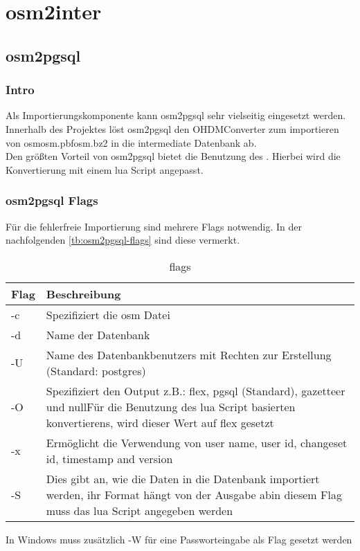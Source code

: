 \part{osm2inter}
\chapter{osm2pgsql}
\section{Intro}
Als Importierungskomponente kann osm2pgsql\cite{osm2pgsql-manual} sehr vielseitig eingesetzt werden. Innerhalb des Projektes löst osm2pgsql den OHDMConverter zum importieren von osm\textbar osm.pbf\textbar osm.bz2 in die intermediate Datenbank ab.\\

Den größten Vorteil von osm2pgsql bietet die Benutzung des . Hierbei wird die Konvertierung mit einem lua Script angepasst.

\section{osm2pgsql Flags}
Für die fehlerfreie Importierung sind mehrere Flags notwendig. In der nachfolgenden \autoref{tb:osm2pgsql-flags} sind diese vermerkt.
\begin{table}[h]
	\caption{flags}
	\label{tb:osm2pgsql-flags}
	\renewcommand{\arraystretch}{1.5}
	\begin{tabularx}{\linewidth}{|l|X|}\hline
		Flag & Beschreibung\\\hline
		-c & Spezifiziert die osm Datei\\\hline
		-d & Name der Datenbank \\\hline
		-U & Name des Datenbankbenutzers mit Rechten zur Erstellung (Standard: postgres)\\\hline
		-O & Spezifiziert den Output z.B.: flex, pgsql (Standard), gazetteer und null\newline Für die Benutzung des lua Script basierten konvertierens, wird dieser Wert auf flex gesetzt\\\hline
		-x & Ermöglicht die Verwendung von user name, user id, changeset id, timestamp and version\\\hline
		-S & Dies gibt an, wie die Daten in die Datenbank importiert werden, ihr Format hängt von der Ausgabe ab\newline in diesem Flag muss das lua Script angegeben werden\\\hline		
	\end{tabularx}\vspace{0.5cm}
In Windows muss zusätzlich -W für eine Passworteingabe als Flag gesetzt werden
\end{table}

